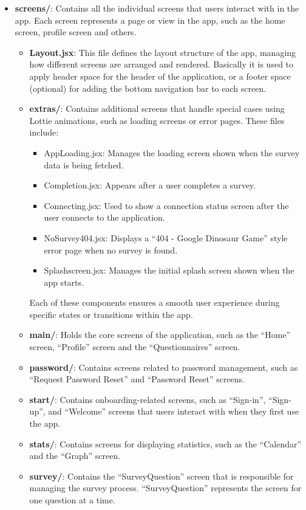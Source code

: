 \begin{itemize}
    \item \textbf{screens/}: Contains all the individual screens that users interact with in the app. Each screen represents a page or view in the app, such as the home screen, profile screen and others.
    \begin{itemize}
        \item \textbf{Layout.jsx}: This file defines the layout structure of the app, managing how different screens are arranged and rendered. Basically it is used to apply header space for the header of the application, or a footer space (optional) for adding the bottom navigation bar to each screen.
        \item \textbf{extras/}: Contains additional screens that handle special cases using Lottie animations, such as loading screens or error pages. These files include:
        \begin{itemize}
            \item AppLoading.jsx: Manages the loading screen shown when the survey data is being fetched.
            \item Completion.jsx: Appears after a user completes a survey.
            \item Connecting.jsx: Used to show a connection status screen after the user connects to the application.
            \item NoSurvey404.jsx: Displays a ``404 - Google Dinosaur Game'' style error page when no survey is found.
            \item Splashscreen.jsx: Manages the initial splash screen shown when the app starts.
        \end{itemize}

        \noindent Each of these components ensures a smooth user experience during specific states or transitions within the app.

        \item \textbf{main/}: Holds the core screens of the application, such as the ``Home'' screen, ``Profile'' screen and the ``Questionnaires'' screen.
        \item \textbf{password/}: Contains screens related to password management, such as ``Request Password Reset'' and ``Password Reset'' screens.
        \item \textbf{start/}: Contains onboarding-related screens, such as ``Sign-in'', ``Sign-up'', and ``Welcome'' screens that users interact with when they first use the app.
        \item \textbf{stats/}: Contains screens for displaying statistics, such as the ``Calendar'' and the ``Graph'' screen.
        \item \textbf{survey/}: Contains the ``SurveyQuestion'' screen that is responsible for managing the survey process. ``SurveyQuestion'' represents the screen for one question at a time.
    \end{itemize}


\end{itemize}
